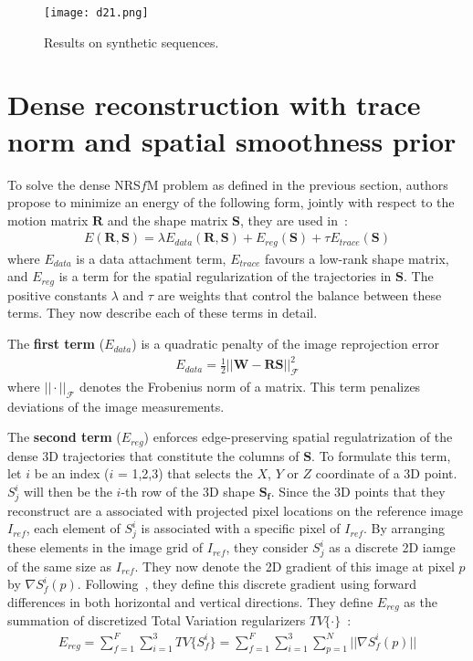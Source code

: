 \documentclass[10pt,twocolumn,letterpaper]{article}
\begin{document}
\begin{figure*}
\begin{center}
\texttt{[image: d21.png]}
\end{center}
\caption{Results on synthetic sequences.}
\label{fig}
\end{figure*}

\section{Dense reconstruction with trace norm and spatial smoothness prior}

To solve the dense NRS$f$M problem as defined in the previous section, authors propose to minimize an energy of the following form, jointly with respect to the motion matrix $\mathbf{R}$ and the shape matrix $\mathbf{S}$, they are used in~\cite{dense}:\\
\begin{gather}
E(\mathbf{R},\mathbf{S}) = \lambda E_{data}(\mathbf{R},\mathbf{S}) + E_{reg}(\mathbf{S}) + \tau E_{trace}(\mathbf{S})
\end{gather}
where $E_{data}$ is a data attachment term, $E_{trace}$ favours a low-rank shape matrix, and $E_{reg}$ is a term for the spatial regularization of the trajectories in $\mathbf{S}$. The positive constants $\lambda$ and $\tau$ are weights that control the balance between these terms. They now describe each of these terms in detail.

The {\bf first term} ($E_{data}$) is a quadratic penalty of the image reprojection error~\cite{dense}\\
\begin{gather}
E_{data} = \frac{1}{2}||\mathbf{W} - \mathbf{RS}||_{\mathcal{F}}^2
\end{gather}
where $||\cdot||_{\mathcal{F}}$ denotes the Frobenius norm of a matrix. This term penalizes deviations of the image measurements.


The {\bf second term} ($E_{reg}$) enforces edge-preserving spatial regulatrization of the dense 3D trajectories that constitute the columns of $\mathbf{S}$. To formulate this term, let $i$ be an index ($i$ = 1,2,3) that selects the $X$, $Y$ or $Z$ coordinate of a 3D point. $S_j^i$ will then be the $i$-th row of the 3D shape $\mathbf{S}_\mathbf{f}$. Since the 3D points that they reconstruct are a associated with projected pixel locations on the reference image $I_{ref}$, each element of $S_j^i$ is associated with a specific pixel of $I_{ref}$. By arranging these elements in the image grid of $I_{ref}$, they consider $S_j^i$ as a discrete 2D iamge of the same size as $I_{ref}$. They now denote the 2D gradient of this image at pixel $p$ by $\nabla S_f^i(p)$. Following~\cite{first}, they define this discrete gradient using forward differences in both horizontal and vertical directions. They define $E_{reg}$ as the summation of discretized Total Variation regularizers $TV\{\cdot\}$~\cite{dense}:\\
\begin{gather}
E_{reg} = \sum_{f=1}^F\sum_{i=1}^3TV\{S_f^i\} = \sum_{f=1}^F\sum_{i=1}^3\sum_{p=1}^N||\nabla S_f^i(p)||
\end{gather}
\end{document}
